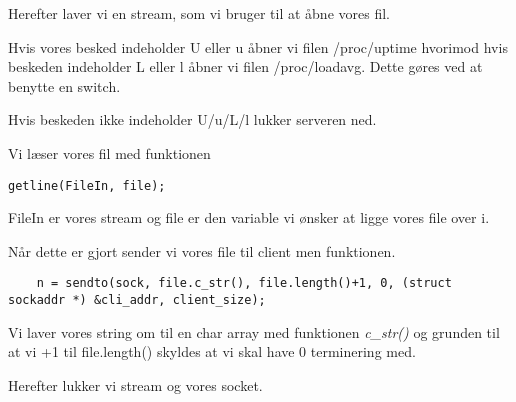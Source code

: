 Herefter laver vi en stream, som vi bruger til at åbne vores fil.

Hvis vores besked indeholder U eller u åbner vi filen /proc/uptime hvorimod hvis beskeden indeholder L eller l åbner vi filen /proc/loadavg. Dette gøres ved at benytte en switch. 

Hvis beskeden ikke indeholder U/u/L/l lukker serveren ned. 

Vi læser vores fil med funktionen

\begin{lstlisting}
getline(FileIn, file);
\end{lstlisting}

FileIn er vores stream og file er den variable vi ønsker at ligge vores file over i. 

Når dette er gjort sender vi vores file til client men funktionen. 
\begin{lstlisting}
	n = sendto(sock, file.c_str(), file.length()+1, 0, (struct sockaddr *) &cli_addr, client_size);
\end{lstlisting}

Vi laver vores string om til en char array med funktionen \textit{c\_str()} og grunden til at vi +1 til file.length() skyldes at vi skal have 0 terminering med. 

Herefter lukker vi stream og vores socket. 




